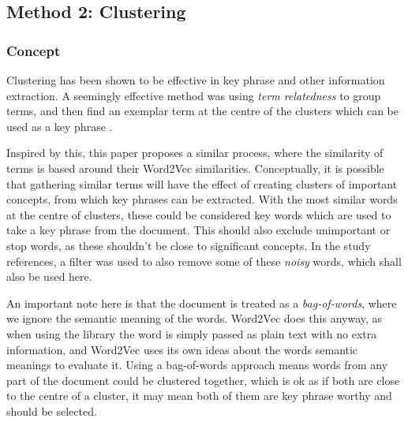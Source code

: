 \subsection{Method 2: Clustering}
\subsubsection*{Concept}
Clustering has been shown to be effective in key phrase and other information extraction. A seemingly effective method was using \textit{term relatedness} to group terms, and then find an exemplar term at the centre of the clusters which can be used as a key phrase \cite{Liu2009}. 

Inspired by this, this paper proposes a similar process, where the similarity of terms is based around their Word2Vec similarities. Conceptually, it is possible that gathering similar terms will have the effect of creating clusters of important concepts, from which key phrases can be extracted. With the most similar words at the centre of clusters, these could be considered key words which are used to take a key phrase from the document. This should also exclude unimportant or stop words, as these shouldn't be close to significant concepts. In the study references, a filter was used to also remove some of these \textit{noisy} words, which shall also be used here.

An important note here is that the document is treated as a \textit{bag-of-words}, where we ignore the semantic meaning of the words. Word2Vec does this anyway, as when using the library the word is simply passed as plain text with no extra information, and Word2Vec uses its own ideas about the words semantic meanings to evaluate it. Using a bag-of-words approach means words from any part of the document could be clustered together, which is ok as if both are close to the centre of a cluster, it may mean both of them are key phrase worthy and should be selected.

